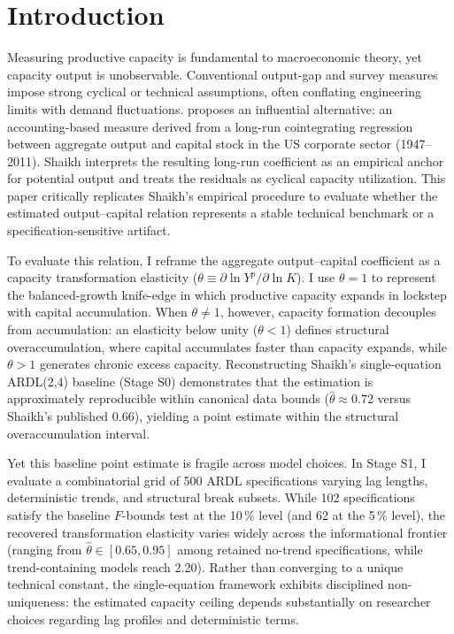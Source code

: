\section{Introduction}
\label{sec:introduction}

Measuring productive capacity is fundamental to macroeconomic theory, yet capacity output is unobservable. Conventional output-gap and survey measures impose strong cyclical or technical assumptions, often conflating engineering limits with demand fluctuations. \citet{Shaikh2016} proposes an influential alternative: an accounting-based measure derived from a long-run cointegrating regression between aggregate output and capital stock in the US corporate sector (1947--2011). Shaikh interprets the resulting long-run coefficient as an empirical anchor for potential output and treats the residuals as cyclical capacity utilization. This paper critically replicates Shaikh's empirical procedure to evaluate whether the estimated output--capital relation represents a stable technical benchmark or a specification-sensitive artifact.

To evaluate this relation, I reframe the aggregate output--capital coefficient as a capacity transformation elasticity ($\theta \equiv \partial \ln Y^p / \partial \ln K$). I use $\theta = 1$ to represent the balanced-growth knife-edge in which productive capacity expands in lockstep with capital accumulation. When $\theta \neq 1$, however, capacity formation decouples from accumulation: an elasticity below unity ($\theta < 1$) defines structural overaccumulation, where capital accumulates faster than capacity expands, while $\theta > 1$ generates chronic excess capacity. Reconstructing Shaikh's single-equation ARDL(2,4) baseline (Stage S0) demonstrates that the estimation is approximately reproducible within canonical data bounds ($\hat{\theta} \approx 0.72$ versus Shaikh's published 0.66), yielding a point estimate within the structural overaccumulation interval.

Yet this baseline point estimate is fragile across model choices. In Stage S1, I evaluate a combinatorial grid of 500 ARDL specifications varying lag lengths, deterministic trends, and structural break subsets. While 102 specifications satisfy the baseline $F$-bounds test at the 10\,\% level (and 62 at the 5\,\% level), the recovered transformation elasticity varies widely across the informational frontier (ranging from $\hat{\theta} \in [0.65, 0.95]$ among retained no-trend specifications, while trend-containing models reach 2.20). Rather than converging to a unique technical constant, the single-equation framework exhibits disciplined non-uniqueness: the estimated capacity ceiling depends substantially on researcher choices regarding lag profiles and deterministic terms.

